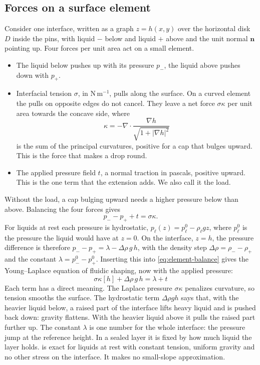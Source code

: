 \documentclass[11pt,a4paper]{article}
\numberwithin{equation}{section}
\newcommand{\nn}{\bm n}
\begin{document}
\subsection{Forces on a surface element}
Consider one interface, written as a graph $z=h(x,y)$ over the horizontal disk
$D$ inside the pins, with liquid $-$ below and liquid $+$ above and the unit
normal $\nn$ pointing up. Four forces per unit area act on a small element.
\begin{itemize}
 \item The liquid below pushes up with its pressure $p_-$, the liquid above
 pushes down with $p_+$.
 \item Interfacial tension $\sigma$, in $\mathrm{N\,m^{-1}}$, pulls along the
 surface. On a curved element the pulls on opposite edges do not cancel. They
 leave a net force $\sigma\kappa$ per unit area towards the concave side, where
 \begin{equation}
  \kappa=-\nabla\cdot\frac{\nabla h}{\sqrt{1+|\nabla h|^2}}
  \label{eq:curvature}
 \end{equation}
 is the sum of the principal curvatures, positive for a cap that bulges upward.
 This is the force that makes a drop round.
 \item The applied pressure field $t$, a normal traction in pascals, positive
 upward. This is the one term that the extension adds. We also call it the
 load.
\end{itemize}
Without the load, a cap bulging upward needs a higher pressure below than
above. Balancing the four forces gives
\begin{equation}
 p_--p_++t=\sigma\kappa .
 \label{eq:element-balance}
\end{equation}
For liquids at rest each pressure is hydrostatic,
$p_\ell(z)=p_\ell^{0}-\rho_\ell gz$, where $p_\ell^0$ is the pressure the liquid
would have at $z=0$. On the interface, $z=h$, the pressure difference is
therefore $p_--p_+=\lambda-\Delta\rho\,g\,h$, with the density step
$\Delta\rho=\rho_--\rho_+$ and the constant $\lambda=p_-^0-p_+^0$. Inserting this
into \cref{eq:element-balance} gives the Young--Laplace equation of fluidic
shaping, now with the applied pressure:
\begin{equation}
 \boxed{\;\sigma\kappa[h]+\Delta\rho\,g\,h=\lambda+t\;}
 \label{eq:young-laplace}
\end{equation}
Each term has a direct meaning. The Laplace pressure $\sigma\kappa$ penalizes
curvature, so tension smooths the surface. The hydrostatic term
$\Delta\rho gh$ says that, with the heavier liquid below, a raised part of the
interface lifts heavy liquid and is pushed back down: gravity flattens. With
the heavier liquid above it pulls the raised part further up. The constant
$\lambda$ is one number for the whole interface: the pressure jump at the
reference height. In a sealed layer it is fixed by how much liquid the layer
holds.  is exact for liquids at rest with
constant tension, uniform gravity and no other stress on the interface. It
makes no small-slope approximation.
\end{document}
